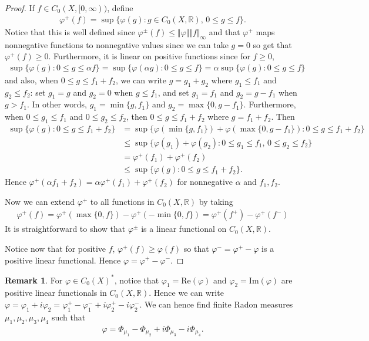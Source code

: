 \documentclass[11pt]{amsart}
\theoremstyle{definition}
\newtheorem{remark}[theorem]{Remark}
\numberwithin{equation}{section}
\begin{document}
\begin{proof}
    If $f\in C_0(X,[0,\infty))$, define 
    \begin{align*}
        \varphi^+(f)=\sup\{\varphi(g):g\in C_0(X,\mathbb R),\,0\le g\le f\}.
    \end{align*}
    Notice that this is well defined since $\varphi^\pm(f)\le\Vert\varphi\Vert\Vert f\Vert_\infty$ and that $\varphi^+$ maps nonnegative functions to nonnegative values since we can take $g=0$ so get that $\varphi^+(f)\ge 0$. Furthermore, it is linear on positive functions since for $f\ge 0$,
    \begin{align*}
        \sup\{\varphi(g):0\le g\le \alpha f\}=\sup\{\varphi(\alpha g):0\le g\le f\}
        =\alpha\sup\{\varphi(g):0\le g\le f\}
    \end{align*}
    and also, when $0\le g\le f_1+f_2$, we can write $g=g_1+g_2$ where $g_1\le f_1$ and $g_2\le f_2$: set $g_1=g$ and $g_2=0$ when $g\le f_1$, and set $g_1=f_1$ and $g_2=g-f_1$ when $g>f_1$. In other words, $g_1=\min\{g,f_1\}$ and $g_2=\max\{0,g-f_1\}$. Furthermore, when $0\le g_1\le f_1$ and $0\le g_2\le f_2$, then $0\le g\le f_1+f_2$ where $g=f_1+f_2$. Then
    \begin{align*}
        \sup\{\varphi(g):0\le g\le f_1+f_2\}&=\sup\{\varphi(\min\{g,f_1\})+\varphi(\max\{0,g-f_1\}):0\le g\le f_1+f_2\}\\
        &\le\sup\{\varphi(g_1)+\varphi(g_2):0\le g_1\le f_1,\,0\le g_2\le f_2\}\\
        &=\varphi^+(f_1)+\varphi^+(f_2)\\
        &\le\sup\{\varphi(g):0\le g\le f_1+f_2\}.
    \end{align*}
    Hence $\varphi^+(\alpha f_1+f_2)=\alpha\varphi^+(f_1)+\varphi^+(f_2)$ for nonnegative $\alpha$ and $f_1,f_2$. 

    Now we can extend $\varphi^+$ to all functions in $C_0(X,\mathbb R)$ by taking 
    \begin{align*}
        \varphi^+(f)=\varphi^+(\max\{0,f\})-\varphi^+(-\min\{0,f\})=\varphi^+(f^+)-\varphi^+(f^-)
    \end{align*}
    It is straightforward to show that $\varphi^\pm$ is a linear functional on $C_0(X,\mathbb R)$.

    Notice now that for positive $f$, $\varphi^+(f)\ge \varphi(f)$ so that $\varphi^-=\varphi^+-\varphi$ is a positive linear functional. Hence $\varphi=\varphi^+-\varphi^-$.
\end{proof}
\begin{remark}
    For $\varphi\in C_0(X)^*$, notice that $\varphi_1=\mathrm{Re}(\varphi)$ and $\varphi_2=\mathrm{Im}(\varphi)$ are positive linear functionals in $C_0(X,\mathbb R)$. Hence we can write $\varphi=\varphi_1+i\varphi_2=\varphi_1^+-\varphi_1^-+i\varphi_2^+-i\varphi_2^-$. We can hence find finite Radon measures $\mu_1,\mu_2,\mu_3,\mu_4$ such that
    \begin{align*}
        \varphi=\Phi_{\mu_1}-\Phi_{\mu_2}+i\Phi_{\mu_3}-i\Phi_{\mu_4}.
    \end{align*}
\end{remark}
\end{document}
